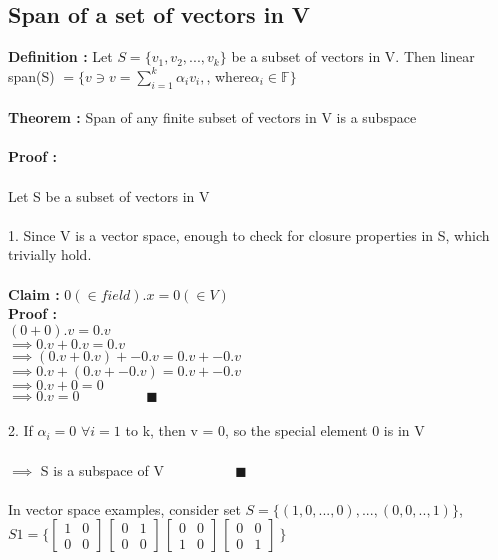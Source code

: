 \documentclass{article}
\begin{document}
    \subsection{Span of a set of vectors in V}
    \textbf{Definition :} Let $S = \{v_1, v_2, ... , v_k\}$ be a subset of vectors in V. Then linear span(S) $ = \{ v \ni v = \sum_{i=1}^k \alpha_i v_i, $, where$\alpha_i \in \mathbb{F} \}$ \\ \\
    \textbf{Theorem : }Span of any finite subset of vectors in V is a subspace \\ \\
    \textbf{Proof :} \\ \\
    Let S be a subset of vectors in V \\ \\
    1. Since V is a vector space, enough to check for closure properties in S, which trivially hold. \\ \\
    \textbf{Claim : } $0(\in field). x = 0(\in V)$ \\
    \textbf{Proof : } \\
    $(0 + 0).v = 0.v$ \\
    $\implies 0.v + 0.v = 0.v$ \\
    $\implies (0.v + 0.v) + -0.v = 0.v + -0.v$ \\
    $\implies 0.v + (0.v + -0.v) = 0.v + -0.v$ \\
    $\implies 0.v + 0 = 0$ \\
    $\implies 0.v = 0 \hspace{2cm} \blacksquare $ \\ \\
    2. If $\alpha_i = 0 $ $\forall i = 1$ to k, then v = 0, so the special element 0 is in V \\ \\
    $\implies$ S is a subspace of V $ \hspace{2cm} \blacksquare $ \\ \\
    In vector space examples, consider set $S =\{(1,0,...,0),...,(0,0,..,1)\}$, $S1=\{ \begin{bmatrix} 1 & 0 \\ 0 & 0 \end{bmatrix}\,\begin{bmatrix} 0 & 1 \\ 0 & 0 \end{bmatrix}\,\begin{bmatrix} 0 & 0 \\ 1 & 0 \end{bmatrix}\,\begin{bmatrix} 0 & 0 \\ 0 & 1 \end{bmatrix}\ \}$ \\ \\
\end{document}
